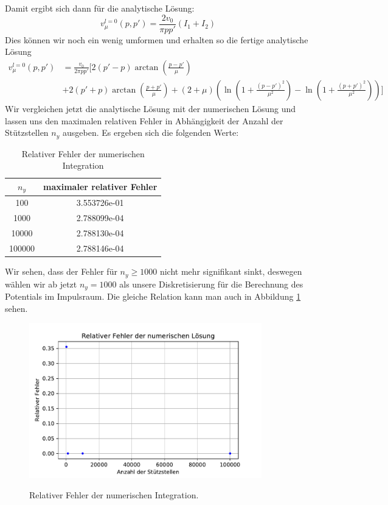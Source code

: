 \documentclass[11pt,a4paper]{article}
\begin{document}
Damit ergibt sich dann für die analytische Lösung:
\begin{equation}
	v_{\mu}^{l=0}(p, p') = \frac{2v_0}{\pi pp'}\left(I_1 +I_2\right)
\end{equation}
Dies können wir noch ein wenig umformen und erhalten so die fertige analytische Lösung
\begin{equation}
\begin{split}
	v_{\mu}^{l=0}(p,p') &= \frac{v_0}{2\pi pp'}[2(p'-p)\arctan(\frac{p-p'}{\mu}) \\ &+2(p'+p)\arctan(\frac{p+p'}{\mu}) +(2+\mu)\left(\ln(1+\frac{(p-p')^2}{\mu^2}) -\ln(1+\frac{(p+p')^2}{\mu^2})\right) ]
\end{split}
\end{equation}
Wir vergleichen jetzt die analytische Lösung mit der numerischen Lösung und lassen uns den maximalen relativen Fehler in Abhängigkeit der Anzahl der Stützstellen $n_y$ ausgeben. Es ergeben sich die folgenden Werte:
\begin{table}[htbp]\begin{center}
		\begin{tabular}{c|c}
		$n_y$ & maximaler relativer Fehler \\ \hline
		100	&   3.553726e-01 \\
		1000	 &  2.788099e-04 \\
		10000	 &  2.788130e-04 \\
		100000	&   2.788146e-04 \\
	\end{tabular}
	\caption{Relativer Fehler der numerischen Integration}
	\end{center}

\end{table}
Wir sehen, dass der Fehler für $n_y \geq 1000$ nicht mehr signifikant sinkt, deswegen wählen wir ab jetzt $n_y=1000$ als unsere Diskretisierung für die Berechnung des Potentials im Impulsraum. Die gleiche Relation kann man auch in Abbildung \ref{fig:rel_error} sehen.
	\begin{figure}[htbp]
	\includegraphics[width=0.9\textwidth]{9_3_relative_abweichung.pdf}\label{fig:rel_error}
	\caption{Relativer Fehler der numerischen Integration.}
	\end{figure}
\end{document}
